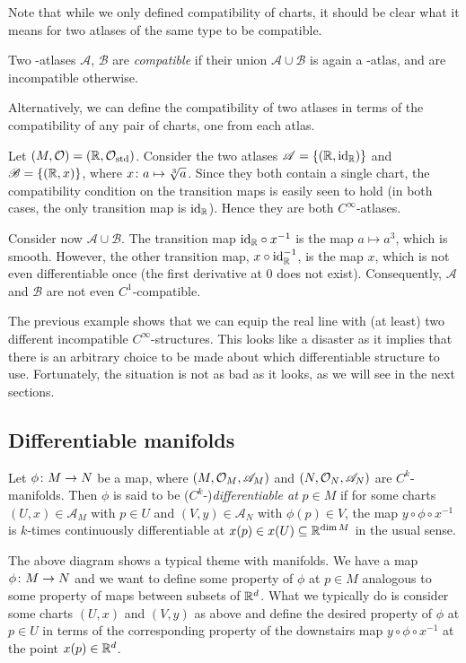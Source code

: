 Note that while we only defined compatibility of charts, it should be clear what it means for two atlases of the same type to be compatible.

\bd
Two {\scalebox{0.75}\FiveFlowerOpen}-atlases $\mathscr{A}$, $\mathscr{B}$ are \emph{compatible} if their union $\mathscr{A}\cup\mathscr{B}$ is again a {\scalebox{0.75}\FiveFlowerOpen}-atlas, and are incompatible otherwise.
\ed

Alternatively, we can define the compatibility of two atlases in terms of the compatibility of any pair of charts, one from each atlas.

\be
Let $(M,\mathcal{O})=(\mathbb{R},\mathcal{O}_\mathrm{std})$. Consider the two atlases $\mathscr{A}=\{(\mathbb{R},\mathrm{id}_{\mathbb{R}})\}$ and $\mathscr{B}=\{(\mathbb{R},x)\}$, where $x\colon a \mapsto \sqrt[3]{a}$. Since they both contain a single chart, the compatibility condition on the transition maps is easily seen to hold (in both cases, the only transition map is $\mathrm{id}_{\mathbb{R}}$). Hence they are both $C^\infty$-atlases.

Consider now $\mathscr{A}\cup\mathscr{B}$. The transition map $\mathrm{id}_{\mathbb{R}}\circ x^{-1}$ is the map $a\mapsto a^3$, which is smooth. However, the other transition map, $x\circ\mathrm{id}_{\mathbb{R}}^{-1}$, is the map $x$, which is not even differentiable once (the first derivative at $0$ does not exist). Consequently, $\mathscr{A}$ and $\mathscr{B}$ are not even $C^1$-compatible.
\ee

The previous example shows that we can equip the real line with (at least) two different incompatible $C^\infty$-structures. This looks like a disaster as it implies that there is an arbitrary choice to be made about which differentiable structure to use. Fortunately, the situation is not as bad as it looks, as we will see in the next sections.

\subsection{Differentiable manifolds}

\bd
Let $\phi\colon M\to N$ be a map, where $(M,\mathcal{O}_M,\mathscr{A}_M)$ and $(N,\mathcal{O}_N,\mathscr{A}_N)$ are $C^k$-manifolds. Then $\phi$ is said to be ($C^k$-)\emph{differentiable at} $p\in M$ if for some charts $(U,x)\in\mathscr{A}_M$ with $p\in U$ and $(V,y)\in\mathscr{A}_N$ with $\phi(p)\in V$, the map $y\circ\phi\circ x^{-1}$ is $k$-times continuously differentiable at $x(p)\in x(U)\subseteq\mathbb{R}^{\dim M}$ in the usual sense.
\bse
{}
\ese
\ed
The above diagram shows a typical theme with manifolds. We have a map $\phi\colon M\to N$ and we want to define some property of $\phi$ at $p\in M$ analogous to some property of maps between subsets of $\mathbb{R}^d$. What we typically do is consider some charts $(U,x)$ and $(V,y)$ as above and define the desired property of $\phi$ at $p\in U$ in terms of the corresponding property of the downstairs map $y\circ\phi\circ x^{-1}$ at the point $x(p)\in\mathbb{R}^d$.

